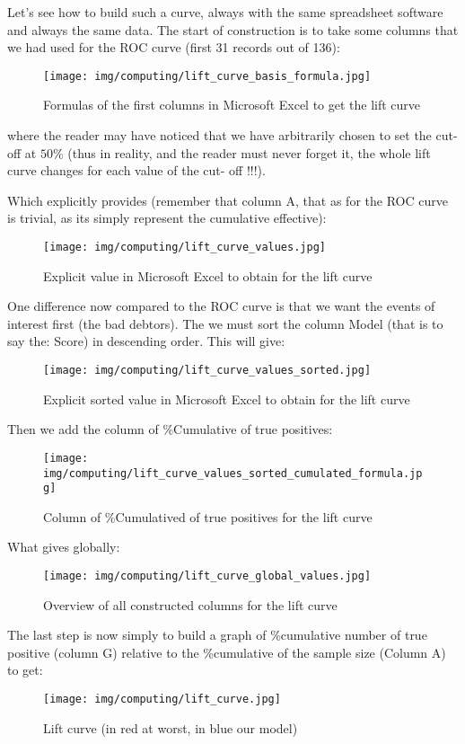 	Let's see how to build such a curve, always with the same spreadsheet software and always the same data. The start of construction is to take some columns that we had used for the ROC curve (first 31 records out of 136):
	\begin{figure}[H]
		\centering
		\texttt{[image: img/computing/lift\_curve\_basis\_formula.jpg]}
		\caption[]{Formulas of the first columns in Microsoft Excel to get the lift curve}
	\end{figure}
	where the reader may have noticed that we have arbitrarily chosen to set the cut-off at $50\%$ (thus in reality, and the reader must never forget it, the whole lift curve changes for each value of the cut- off !!!).
	
	Which explicitly provides (remember that column A, that as for the ROC curve is trivial, as its simply represent the cumulative effective):
	\begin{figure}[H]
		\centering
		\texttt{[image: img/computing/lift\_curve\_values.jpg]}
		\caption[]{Explicit value in Microsoft Excel to obtain for the lift curve}
	\end{figure}
	One difference now compared to the ROC curve is that we want the events of interest first (the bad debtors). The we must sort the column Model (that is to say the: Score) in descending order. This will give:
	\begin{figure}[H]
		\centering
		\texttt{[image: img/computing/lift\_curve\_values\_sorted.jpg]}
		\caption[]{Explicit sorted value in Microsoft Excel to obtain for the lift curve}
	\end{figure}
	Then we add the column of \%Cumulative of true positives:
	\begin{figure}[H]
		\centering
		\texttt{[image: img/computing/lift\_curve\_values\_sorted\_cumulated\_formula.jpg]}
		\caption[]{Column of \%Cumulatived of true positives for the lift curve}
	\end{figure}
	What gives globally:
	\begin{figure}[H]
		\centering
		\texttt{[image: img/computing/lift\_curve\_global\_values.jpg]}
		\caption{Overview of all constructed columns for the lift curve}
	\end{figure}
	The last step is now simply to build a graph of \%cumulative number of true positive (column G) relative to the \%cumulative of the sample size (Column A) to get:
	\begin{figure}[H]
		\centering
		\texttt{[image: img/computing/lift\_curve.jpg]}
		\caption[]{Lift curve (in red at worst, in blue our model)}
	\end{figure}
